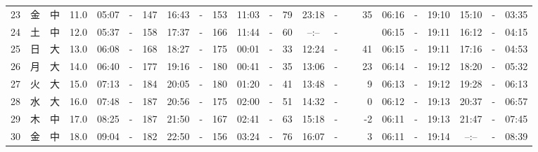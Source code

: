 \documentclass[12pt,a4j]{jsarticle}
\begin{document}
\begin{table}[htbp]
\begin{center}
{\begin{tabular}{|rc|cr|ccrccr|ccrccr|ccc|ccc|}
23 & 金 & 中 & 11.0 &  05:07 &-& 147 &  16:43 &-& 153 &  11:03 &-&  79 &  23:18 &-&  35 & 06:16 & -& 19:10 & 15:10 & -& 03:35 \\
24 & 土 & 中 & 12.0 &  05:37 &-& 158 &  17:37 &-& 166 &  11:44 &-&  60 &  --:-- &-&~~~~~ & 06:15 & -& 19:11 & 16:12 & -& 04:15 \\
25 & 日 & 大 & 13.0 &  06:08 &-& 168 &  18:27 &-& 175 &  00:01 &-&  33 &  12:24 &-&  41 & 06:15 & -& 19:11 & 17:16 & -& 04:53 \\
26 & 月 & 大 & 14.0 &  06:40 &-& 177 &  19:16 &-& 180 &  00:41 &-&  35 &  13:06 &-&  23 & 06:14 & -& 19:12 & 18:20 & -& 05:32 \\
27 & 火 & 大 & 15.0 &  07:13 &-& 184 &  20:05 &-& 180 &  01:20 &-&  41 &  13:48 &-&   9 & 06:13 & -& 19:12 & 19:28 & -& 06:13 \\
28 & 水 & 大 & 16.0 &  07:48 &-& 187 &  20:56 &-& 175 &  02:00 &-&  51 &  14:32 &-&   0 & 06:12 & -& 19:13 & 20:37 & -& 06:57 \\
29 & 木 & 中 & 17.0 &  08:25 &-& 187 &  21:50 &-& 167 &  02:41 &-&  63 &  15:18 &-&  -2 & 06:11 & -& 19:13 & 21:47 & -& 07:45 \\
30 & 金 & 中 & 18.0 &  09:04 &-& 182 &  22:50 &-& 156 &  03:24 &-&  76 &  16:07 &-&   3 & 06:11 & -& 19:14 & --:-- & -& 08:39 \\
   \hline
   \end{tabular}}
   \end{center}
\end{table}
\newpage
\end{document}
